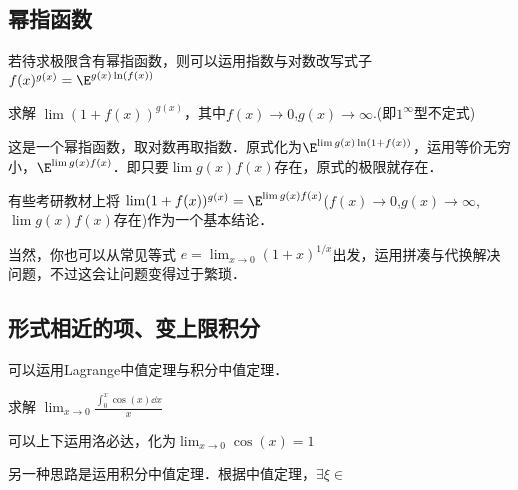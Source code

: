 \subsection{幂指函数}
若待求极限含有幂指函数，则可以运用指数与对数改写式子 $f(x)^{g(x)}=\E^{g(x)\ln(f(x))}$
\begin{example}{}
求解 $\lim (1+f(x))^{g(x)}$，其中$f(x)\to0$,$g(x)\to\infty$.(即$1^\infty$型不定式)

这是一个幂指函数，取对数再取指数．原式化为$\E^{\lim g(x) \ln (1+f(x))}$，运用等价无穷小，$\E^{\lim g(x) f(x)}$．即只要$\lim g(x) f(x)$存在，原式的极限就存在．

有些考研教材上将 $\lim (1+f(x))^{g(x)} = \E^{\lim g(x) f(x) }$($f(x)\to0$,$g(x)\to\infty$,$\lim g(x) f(x)$存在)作为一个基本结论．

当然，你也可以从常见等式 $e=\lim_{x\to0} (1+x)^{1/x}$出发，运用拼凑与代换解决问题，不过这会让问题变得过于繁琐．
\end{example}

\subsection{形式相近的项、变上限积分}
可以运用Lagrange中值定理与积分中值定理．

\begin{example}{}
求解 $\lim_{x\to0} \frac{\int^x_0 \cos(x) \dd x}{x}$

可以上下运用洛必达，化为$\lim_{x\to0} \cos(x) = 1$

另一种思路是运用积分中值定理．根据中值定理，$\exists \xi \in $
\end{example}